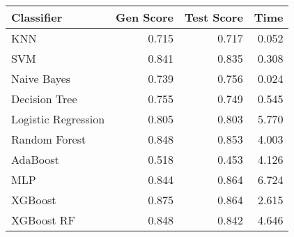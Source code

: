 \begin{tabular}{lrrr}
\toprule
Classifier & Gen Score & Test Score & Time \\
\midrule
KNN & 0.715 & 0.717 & 0.052 \\
SVM & 0.841 & 0.835 & 0.308 \\
Naive Bayes & 0.739 & 0.756 & 0.024 \\
Decision Tree & 0.755 & 0.749 & 0.545 \\
Logistic Regression & 0.805 & 0.803 & 5.770 \\
Random Forest & 0.848 & 0.853 & 4.003 \\
AdaBoost & 0.518 & 0.453 & 4.126 \\
MLP & 0.844 & 0.864 & 6.724 \\
XGBoost & 0.875 & 0.864 & 2.615 \\
XGBoost RF & 0.848 & 0.842 & 4.646 \\
\bottomrule
\end{tabular}

